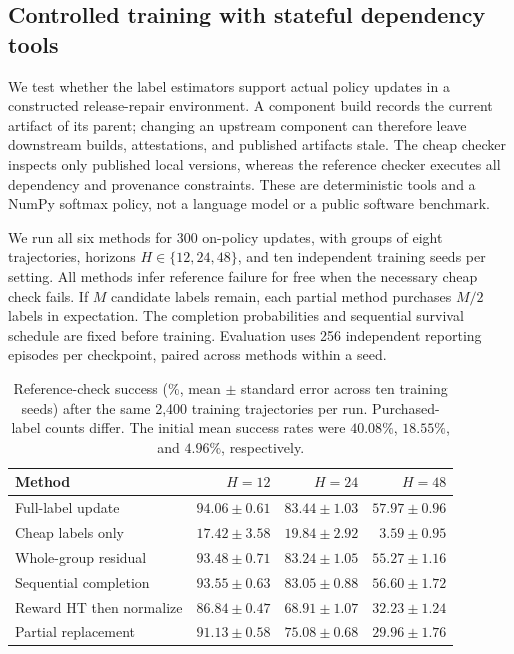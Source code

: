 \subsection{Controlled training with stateful dependency tools}
\label{sec:stateful-training}

We test whether the label estimators support actual policy updates in a
constructed release-repair environment. A component build records the current
artifact of its parent; changing an upstream component can therefore leave
downstream builds, attestations, and published artifacts stale. The cheap
checker inspects only published local versions, whereas the reference checker
executes all dependency and provenance constraints. These are deterministic
tools and a NumPy softmax policy, not a language model or a public software
benchmark.

We run all six methods for 300 on-policy updates, with groups of eight
trajectories, horizons $H\in\{12,24,48\}$, and ten independent training seeds
per setting. All methods infer reference failure for free when the necessary
cheap check fails. If $M$ candidate labels remain, each partial method purchases
$M/2$ labels in expectation. The completion probabilities and sequential
survival schedule are fixed before training. Evaluation uses 256 independent
reporting episodes per checkpoint, paired across methods within a seed.

\begin{table}[t]
\centering
\small
\setlength{\tabcolsep}{4pt}
\begin{tabular}{lrrr}
\toprule
Method & $H=12$ & $H=24$ & $H=48$ \\
\midrule
Full-label update & $94.06\pm0.61$ & $83.44\pm1.03$ & $57.97\pm0.96$ \\
Cheap labels only & $17.42\pm3.58$ & $19.84\pm2.92$ & $3.59\pm0.95$ \\
Whole-group residual & $93.48\pm0.71$ & $83.24\pm1.05$ & $55.27\pm1.16$ \\
Sequential completion & $93.55\pm0.63$ & $83.05\pm0.88$ & $56.60\pm1.72$ \\
Reward HT then normalize & $86.84\pm0.47$ & $68.91\pm1.07$ & $32.23\pm1.24$ \\
Partial replacement & $91.13\pm0.58$ & $75.08\pm0.68$ & $29.96\pm1.76$ \\
\bottomrule
\end{tabular}
\caption{Reference-check success (\%, mean $\pm$ standard error across ten
training seeds) after the same 2,400 training trajectories per run.
Purchased-label counts differ. The initial mean success rates were
$40.08\%$, $18.55\%$, and $4.96\%$, respectively.}
\label{tab:stateful-training}
\end{table}


